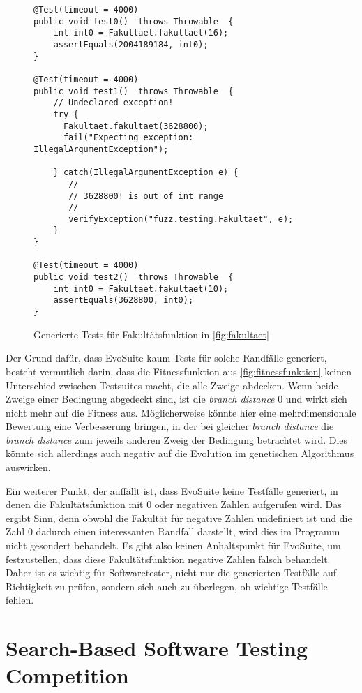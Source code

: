\documentclass[a4paper,11pt]{article}
\begin{document}
\begin{figure}[h]
	\begin{lstlisting}[basicstyle=\ttfamily\tiny]
@Test(timeout = 4000)
public void test0()  throws Throwable  {
    int int0 = Fakultaet.fakultaet(16);
    assertEquals(2004189184, int0);
}

@Test(timeout = 4000)
public void test1()  throws Throwable  {
    // Undeclared exception!
    try { 
      Fakultaet.fakultaet(3628800);
      fail("Expecting exception: IllegalArgumentException");
    
    } catch(IllegalArgumentException e) {
       //
       // 3628800! is out of int range
       //
       verifyException("fuzz.testing.Fakultaet", e);
    }
}

@Test(timeout = 4000)
public void test2()  throws Throwable  {
    int int0 = Fakultaet.fakultaet(10);
    assertEquals(3628800, int0);
}
	\end{lstlisting}
	\caption{Generierte Tests für Fakultätsfunktion in \cref{fig:fakultaet}}
	\label{fig:fakultaet_tests}
\end{figure}

Der Grund dafür, dass EvoSuite kaum Tests für solche Randfälle generiert, besteht vermutlich darin, dass die Fitnessfunktion aus \cref{fig:fitnessfunktion} keinen Unterschied zwischen Testsuites macht, die alle Zweige abdecken.
Wenn beide Zweige einer Bedingung abgedeckt sind, ist die \textit{branch distance} 0 und wirkt sich nicht mehr auf die Fitness aus.
Möglicherweise könnte hier eine mehrdimensionale Bewertung eine Verbesserung bringen, in der bei gleicher \textit{branch distance} die \textit{branch distance} zum jeweils anderen Zweig der Bedingung betrachtet wird.
Dies könnte sich allerdings auch negativ auf die Evolution im genetischen Algorithmus auswirken.

Ein weiterer Punkt, der auffällt ist, dass EvoSuite keine Testfälle generiert, in denen die Fakultätsfunktion mit 0 oder negativen Zahlen aufgerufen wird.
Das ergibt Sinn, denn obwohl die Fakultät für negative Zahlen undefiniert ist und die Zahl 0 dadurch einen interessanten Randfall darstellt, wird dies im Programm nicht gesondert behandelt.
Es gibt also keinen Anhaltspunkt für EvoSuite, um festzustellen, dass diese Fakultätsfunktion negative Zahlen falsch behandelt.
Daher ist es wichtig für Softwaretester, nicht nur die generierten Testfälle auf Richtigkeit zu prüfen, sondern sich auch zu überlegen, ob wichtige Testfälle fehlen.

\section{Search-Based Software Testing Competition}
\end{document}
